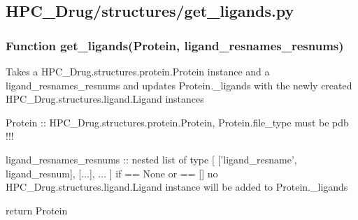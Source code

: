 

\subsection{HPC\_Drug/structures/get\_ligands.py}

    \subsubsection{Function get\_ligands(Protein, ligand\_resnames\_resnums)}

        Takes a HPC\_Drug.structures.protein.Protein instance and a ligand\_resnames\_resnums
        and updates Protein.\_ligands with the newly created HPC\_Drug.structures.ligand.Ligand
        instances

        Protein :: HPC\_Drug.structures.protein.Protein, Protein.file\_type must be pdb !!!

        ligand\_resnames\_resnums :: nested list of type [ ['ligand\_resname', ligand\_resnum], [...], ... ]
        if == None or == [] no HPC\_Drug.structures.ligand.Ligand instance will be added to Protein.\_ligands

        return Protein